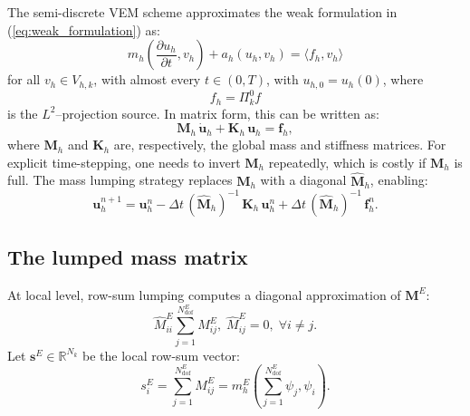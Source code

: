 \documentclass{article}
\begin{document}
The semi-discrete VEM scheme approximates the weak formulation in (\ref{eq:weak_formulation}) as:
\begin{equation}\label{eq:discrete_form}
    m_h \left( \frac{\partial u_h}{\partial t}, v_h\right) + a_h(u_h, v_h) = \langle f_h, v_h \rangle
\end{equation}
for all $v_h \in V_{h,k}$, with almost every $t \in (0,T)$, with $u_{h,0} = u_h(0)$, where
\begin{equation}
    \nonumber
    f_h = \Pi^0_k f    
\end{equation}
is the $L^2$--projection source. In matrix form, this can be written as:
\begin{equation}\label{eq:matrix_form}
    \mathbf{M}_h \, \dot{\mathbf{u}}_h + \mathbf{K}_h \, \mathbf{u}_h = \mathbf{f}_h,
\end{equation}
where $\mathbf{M}_h$ and $\mathbf{K}_h$ are, respectively, the global mass and stiffness matrices. For explicit time-stepping, one needs to invert $\mathbf{M}_h$ repeatedly, which is costly if $\mathbf{M}_h$ is full. The mass lumping strategy replaces $\mathbf{M}_h$ with a diagonal $\hat{\mathbf{M}}_h$, enabling:
\begin{equation}
    \nonumber
    \mathbf{u}^{n+1}_h = \mathbf{u}^n_h - \Delta t \, (\hat{\mathbf{M}}_h)^{-1} \, \mathbf{K}_h \, \mathbf{u}_h^n + \Delta t \, (\hat{\mathbf{M}}_h)^{-1} \, \mathbf{f}_h^n.
\end{equation}


\subsection{The lumped mass matrix}
\label{sec:lumped_mass_matrix}

At local level, row-sum lumping computes a diagonal approximation of $\mathbf{M}^E$:
\begin{equation}
    \nonumber
    \hat{M}^E_{ii} \sum \limits^{N^E_{\text{dof}}}_{j=1} M^E_{ij}, \; \hat{M}^E_{ij} = 0, \; \forall i\neq j. 
\end{equation}
Let $\mathbf{s}^E \in \mathbb{R}^{N_k}$ be the local row-sum vector:
\begin{equation}
    \nonumber
    s^E_i = \sum \limits^{N^E_{\text{dof}}}_{j=1} M^E_{ij} = m^E_h \left( \sum \limits^{N^E_{\text{dof}}}_{j=1} \psi_j, \psi_i \right).
\end{equation}
\end{document}
